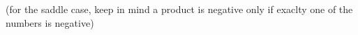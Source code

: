 







(for the saddle case, keep in mind a product is negative only 
if exaclty one of the numbers is negative) 

